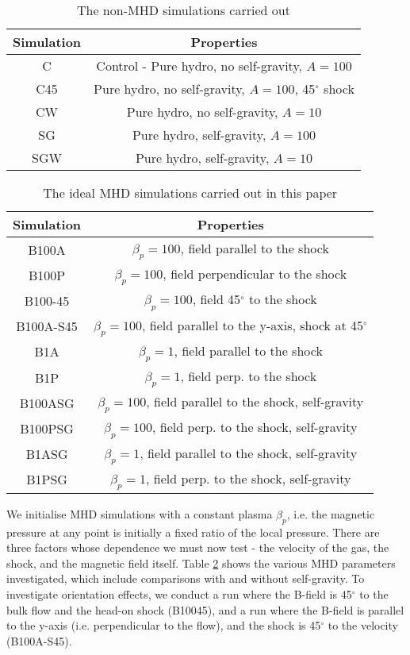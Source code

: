 \documentclass[a4paper,fleqn,usenatbib]{mnras}
\begin{document}
\begin{table}
\centering
  \caption{The non-MHD simulations carried out \label{tab:purehydro}}
  \begin{tabular}{c | c}
  \hline
  \hline
   Simulation  &  Properties  \\
   \hline
   C & Control - Pure hydro, no self-gravity, $A=100$ \\ 
   C45 & Pure hydro, no self-gravity, $A=100$, 45$^\circ$ shock \\
   CW & Pure hydro, no self-gravity, $A=10$ \\
   SG & Pure hydro, self-gravity, $A=100$ \\
   SGW & Pure hydro, self-gravity, $A=10$ \\
 \hline
  \hline
\end{tabular}
\end{table}

\begin{table}
\centering
  \caption{The ideal MHD simulations carried out in this paper \label{tab:MHD}}
  \begin{tabular}{c | c}
  \hline
  \hline
   Simulation  &  Properties  \\
   \hline
   B100A & $\beta_p=100$, field parallel to the shock \\
   B100P & $\beta_p=100$, field perpendicular to the shock \\
   B100-45 & $\beta_p=100$, field 45$^\circ$ to the shock \\
   B100A-S45 & $\beta_p=100$, field parallel to the y-axis, shock at 45$^\circ$ \\
   B1A & $\beta_p=1$, field parallel to the shock \\
   B1P & $\beta_p=1$, field perp. to the shock \\
   B100ASG & $\beta_p=100$, field parallel to the shock, self-gravity \\
   B100PSG & $\beta_p=100$, field perp. to the shock, self-gravity \\
   B1ASG & $\beta_p=1$, field parallel to the shock, self-gravity \\
   B1PSG & $\beta_p=1$, field perp. to the shock, self-gravity\\
 \hline
  \hline
\end{tabular}
\end{table}

\noindent We initialise MHD simulations with a constant plasma $\beta_p$, i.e. the magnetic pressure at any point is initially a fixed ratio of the local pressure.  There are three factors whose dependence we must now test - the velocity of the gas, the shock, and the magnetic field itself.  Table \ref{tab:MHD} shows the various MHD parameters investigated, which include comparisons with and without self-gravity.  To investigate orientation effects, we conduct a run where the B-field is 45$^\circ$ to the bulk flow and the head-on shock (B10045), and a run where the B-field is parallel to the y-axis (i.e. perpendicular to the flow), and the shock is 45$^\circ$ to the velocity (B100A-S45).
\end{document}
